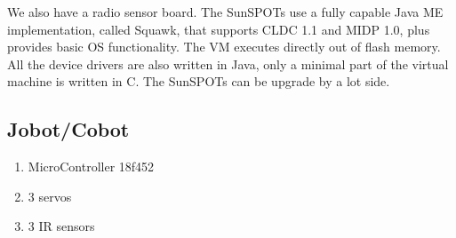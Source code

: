 \documentclass[a4paper,12pt]{article}
\begin{document}
We also have a radio sensor board. The SunSPOTs use a fully capable Java ME
implementation, called Squawk, that supports CLDC 1.1 and MIDP 1.0, plus
provides basic OS functionality. The VM executes directly out of flash memory.
All the device drivers are also written in Java, only a minimal part of the
virtual machine is written in C. The SunSPOTs can be upgrade by a lot side.

\subsection{Jobot/Cobot}
\label{app:cobot}

\begin{enumerate}
	\item MicroController 18f452
	\item 3 servos
	\item 3 IR sensors
\end{enumerate}



\end{document}
